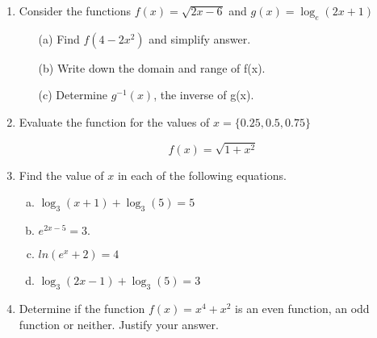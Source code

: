 \documentclass[a4paper,12pt]{article}
\begin{document}
\begin{enumerate}
\item Consider the functions $f(x) = \sqrt{2x-6}$ and  $g(x) = \log_e(2x + 1)$

\begin{itemize}
	\item[(a)]Find $f(4 - 2x^2)$ and simplify answer.
	\item[(b)] Write down the domain and range of f(x).
	\item[(c)] Determine $g^{-1}(x)$, the inverse of g(x).
\end{itemize}

	\item  Evaluate the function for the values of  $ x = \{0.25, 0.5 , 0.75 \}$
	
	\[  f(x) = \sqrt{1+x^2} \]
	

	
	\item Find the value of $x$ in each of the following equations.

\begin{multicols}{2}
	\begin{enumerate}[(a)]
\item $\log_3(x + 1) + \log_3(5) = 5$
\item $e^{2x-5} = 3. $
\item $ln(e^x+2) = 4$
	\item $\log_3(2x - 1) + \log_3(5) = 3$
\end{enumerate}
\end{multicols}	

\item  Determine if the function $f(x) = x^4 + x^2$ is an even function, an odd function or neither. Justify your answer.



	

\end{enumerate}
\end{document}

